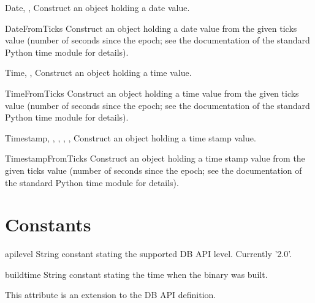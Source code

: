 \documentclass{manual}
\begin{document}
\begin{funcdesc}{Date}{, , }
  Construct an object holding a date value.
\end{funcdesc}

\begin{funcdesc}{DateFromTicks}{}
  Construct an object holding a date value from the given ticks value (number
  of seconds since the epoch; see the documentation of the standard Python
  time module for details).
\end{funcdesc}

\begin{funcdesc}{Time}{, , }
  Construct an object holding a time value.
\end{funcdesc}

\begin{funcdesc}{TimeFromTicks}{}
  Construct an object holding a time value from the given ticks value (number
  of seconds since the epoch; see the documentation of the standard Python
  time module for details).
\end{funcdesc}

\begin{funcdesc}{Timestamp}{, , ,
    , , }
  Construct an object holding a time stamp value.
\end{funcdesc}

\begin{funcdesc}{TimestampFromTicks}{}
  Construct an object holding a time stamp value from the given ticks value
  (number of seconds since the epoch; see the documentation of the standard
  Python time module for details).
\end{funcdesc}

\section{Constants}\label{constants}

\begin{datadesc}{apilevel}
  String constant stating the supported DB API level. Currently '2.0'.
\end{datadesc}

\begin{datadesc}{buildtime}
  String constant stating the time when the binary was built.

   This attribute is an extension to the DB API definition.
\end{datadesc}
\end{document}
